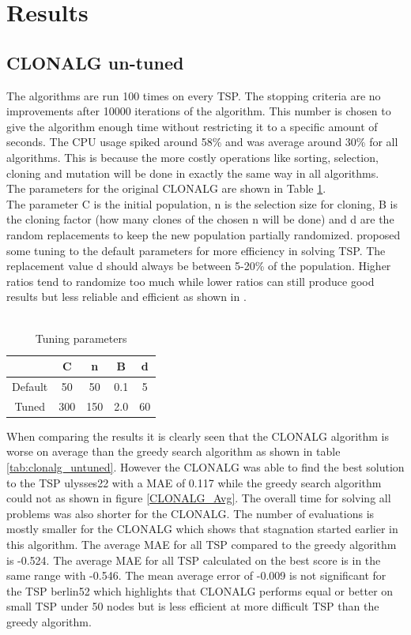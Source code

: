 \section{Results}
\subsection{CLONALG un-tuned}
The algorithms are run 100 times on every TSP. The stopping criteria are no improvements after 10000 iterations of the algorithm. This number is chosen to give the algorithm enough time without restricting it to a specific amount of seconds. The CPU usage spiked around 58\% and was average around 30\% for all algorithms. This is because the more costly operations like sorting, selection, cloning and mutation will be done in exactly the same way in all algorithms.\\
The parameters for the original CLONALG are shown in Table \ref{tuning}.\\
The parameter C is the initial population, n is the selection size for cloning, B is the cloning factor (how many clones of the chosen n will be done) and d are the random replacements to keep the new population partially randomized. \cite{DEC02} proposed some tuning to the default parameters for more efficiency in solving TSP. The replacement value d should always be between 5-20\% of the population. Higher ratios tend to randomize too much while lower ratios can still produce good results but less reliable and efficient as shown in \cite{DEC02}.\\\\
\begin{table}[H]
	\begin{tabular}{|c|c|c|c|c|}
		\hline
		& C   & n   & B   & d  \\ \hline
		Default & 50  & 50  & 0.1 & 5  \\ \hline
		Tuned   & 300 & 150 & 2.0 & 60 \\ \hline
	\end{tabular}
	\caption{Tuning parameters}
	\label{tuning}
\end{table} 
When comparing the results it is clearly seen that the CLONALG algorithm is worse on average than the greedy search algorithm as shown in table \ref{tab:clonalg_untuned}. However the CLONALG was able to find the best solution to the TSP ulysses22 with a MAE of 0.117 while the greedy search algorithm could not as shown in figure \ref{CLONALG_Avg}. The overall time for solving all problems was also shorter for the CLONALG. The number of evaluations is mostly smaller for the CLONALG which shows that stagnation started earlier in this algorithm. The average MAE for all TSP compared to the greedy algorithm is -0.524. The average MAE for all TSP calculated on the best score is in the same range with -0.546. The mean average error of -0.009 is not significant for the TSP berlin52 which highlights that CLONALG performs equal or better on small TSP under 50 nodes but is less efficient at more difficult TSP than the greedy algorithm.
